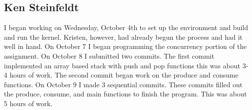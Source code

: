 \documentclass[10pt,letterpaper,onecolumn,draftclsnofoot]{IEEEtran}
\begin{document}
\subsection{Ken Steinfeldt}
I began working on Wednesday, October 4th to set up the environment and build
and run the kernel. Kristen, however, had already begun the process and had it
well in hand. On October 7 I began programming the concurrency portion of the 
assignment. On October 8 I submitted two commits. The first commit implemented 
an array based stack with push and pop functions this was about 3-4 hours of 
work. The second commit began work on the produce and consume functions. On 
October 9 I made 3 sequential commits. These commits filled out the produce, 
consume, and main functions to finish the program. This was about 5 hours of work.
\end{document}
